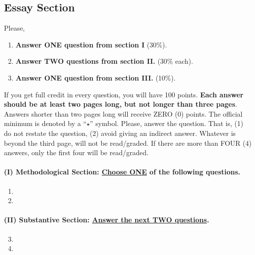 \documentclass{article}
\begin{document}
\subsection*{Essay Section}

Please, 

\begin{enumerate}
    \item {\bf Answer ONE question from section I} (30\%).
    \item {\bf Answer TWO questions from section II.} (30\% each).
    \item {\bf Answer ONE question from section III.} (10\%).
\end{enumerate}

If you get full credit in every question, you will have 100 points. {\bf Each answer should be at least two pages long, but not longer than three pages}. Answers shorter than two pages long will receive ZERO (0) points. The official minimum is denoted by a ``$\star$'' symbol. Please, answer the question. That is, (1) do not restate the question, (2) avoid giving an indirect answer. Whatever is beyond the third page, will not be read/graded. If there are more than FOUR (4) answers, only the first four will be read/graded.


\paragraph{(I) Methodological Section: \underline{Choose ONE} of the following questions.}


\begin{enumerate}
    \item {\unskip} 
    
    \item {\unskip} 
\end{enumerate}




\paragraph{(II) Substantive Section: \underline{Answer the next TWO questions}.}


\begin{enumerate}  \setcounter{enumi}{2}
    \item {\unskip} 
    \item {\unskip} 
\end{enumerate}
\end{document}
